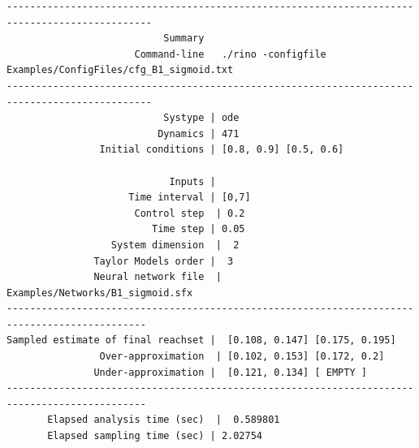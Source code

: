\documentclass{article}
\begin{document}
\begin{verbatim}
-----------------------------------------------------------------------------------------------
                           Summary   
                      Command-line   ./rino -configfile Examples/ConfigFiles/cfg_B1_sigmoid.txt 
----------------------------------------------------------------------------------------------- 
                           Systype | ode
                          Dynamics | 471
                Initial conditions | [0.8, 0.9] [0.5, 0.6] 

                            Inputs | 
                     Time interval | [0,7]
                      Control step  | 0.2
                         Time step | 0.05
                  System dimension  |  2
               Taylor Models order |  3
               Neural network file  |  Examples/Networks/B1_sigmoid.sfx
----------------------------------------------------------------------------------------------
Sampled estimate of final reachset |  [0.108, 0.147] [0.175, 0.195] 
                Over-approximation  | [0.102, 0.153] [0.172, 0.2] 
               Under-approximation |  [0.121, 0.134] [ EMPTY ] 
----------------------------------------------------------------------------------------------
       Elapsed analysis time (sec)  |  0.589801
       Elapsed sampling time (sec) | 2.02754
\end{verbatim}
\normalsize

\end{document}
